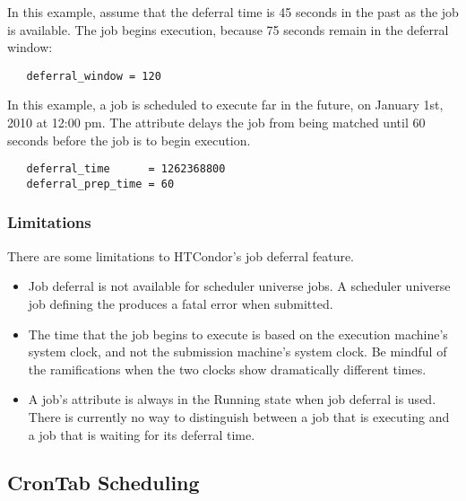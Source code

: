 In this example, assume that the deferral time is 45 seconds
in the past as the job is available.
The job begins execution, because 75 seconds remain in the
deferral window:

\begin{verbatim} 
   deferral_window = 120
\end{verbatim}

In this example, a job is scheduled to execute
far in the future,
on January 1st, 2010 at 12:00 pm. 
The  attribute delays the job 
from being matched until 60 seconds before the job is to begin execution. 

\begin{verbatim}
   deferral_time      = 1262368800
   deferral_prep_time = 60
\end{verbatim}

\subsubsection{Limitations}
\label{sec:JobDeferral-Limitations}
There are some limitations to HTCondor's job deferral feature.

\begin{itemize}
\item Job deferral is not available for scheduler universe jobs.
A scheduler universe job defining the 
produces a fatal error when submitted.

\item The time that the job begins to execute 
is based on the execution machine's system clock, 
and not the submission machine's system clock. 
Be mindful of the ramifications when
the two clocks show dramatically different times.

\item A job's  attribute is always in the Running state 
when job deferral is used.
There is currently no way to distinguish between a job that is 
executing and a job that is waiting for its deferral time. 

\end{itemize}

\subsection{CronTab Scheduling}
\label{sec:CronTab}

